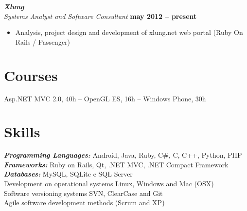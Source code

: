 \documentclass[margin, 10pt]{res} %
\begin{document}
\begin{resume}
{\sl\bf Xlung} \\
{\sl Systems Analyst and Software Consultant} \hfill {\bf may 2012 -- present}
\begin{itemize} \itemsep -2pt 
\item Analysis, project design and development of xlung.net web portal (Ruby On Rails / Passenger)
\end{itemize} 

\section{Courses}
Asp.NET MVC 2.0, 40h -- OpenGL ES, 16h -- Windows Phone, 30h


\section{Skills}
{\sl\bf Programming Languages:}  Android, Java, Ruby, C\#, C, C++, Python, PHP \\
{\sl\bf Frameworks:} Ruby on Rails, Qt, .NET MVC, .NET Compact Framework \\
{\sl\bf Databases:} MySQL, SQLite e SQL Server \\
Development on operational systems Linux, Windows and Mac (OSX) \\
Software versioning systems SVN, ClearCase and Git \\
Agile software development methods (Scrum and XP) \\



\end{resume}
\end{document}
